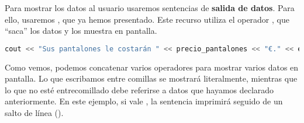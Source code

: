 Para mostrar los datos al usuario usaremos sentencias de \textbf{salida de datos}.
Para ello, usaremos , que ya hemos presentado.
Este recurso utiliza el operador \code{<{}<}, que ``saca'' los datos y los muestra en pantalla.

\begin{lstlisting}[language=c++]
cout << "Sus pantalones le costarán " << precio_pantalones << "€." << endl;
\end{lstlisting}

Como vemos, podemos concatenar varios operadores \code{<{}<} para mostrar varios datos en pantalla.
Lo que escribamos entre comillas se mostrará literalmente, mientras que lo que no esté entrecomillado debe referirse a datos que hayamos declarado anteriormente.
En este ejemplo, si  vale , la sentencia imprimirá  seguido de un salto de línea ().
